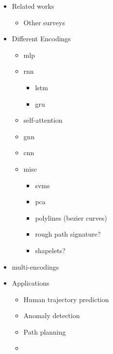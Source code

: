 

\begin{itemize}
    
    \item Related works
    \begin{itemize}
        \item Other surveys 
    \end{itemize}

    \item Different Encodings
    \begin{itemize}
        \item mlp
        \item rnn
        \begin{itemize}
            \item lstm
            \item gru
        \end{itemize}
        \item self-attention
        \item gnn
        \item cnn
        
        \item misc
        \begin{itemize}
            \item svms
            \item pca
            \item polylines (bezier curves)
            \item rough path signature?
            \item shapelets?
        \end{itemize}
    \end{itemize}

    \item multi-encodings

    \item Applications
        \begin{itemize}
            \item Human trajectory prediction
            \item Anomaly detection
            \item Path planning
            \item 
        \end{itemize}


\end{itemize}
